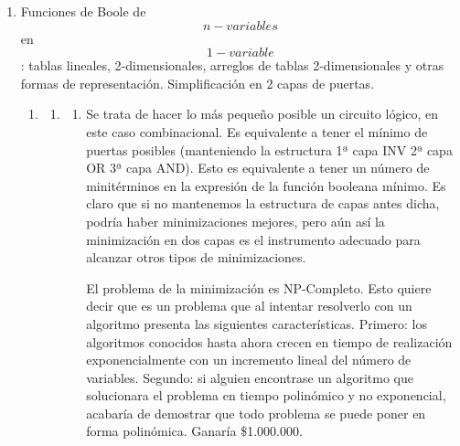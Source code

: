 \begin{enumerate}
\begin{enumerate}
\begin{enumerate}
\begin{enumerate}
        \[\mathtt{\mathrm{H}} = \begin{pmatrix}
        1 & 0 \\
        0 & 1 \\
        1 & 0 \\
        0 & 1
        \end{pmatrix}\]

        \[\begin{pmatrix}
        0 & 1 & 0 & 1 \\
        0 & 0 & 1 & 1
        \end{pmatrix}\rightarrow\begin{pmatrix}
        0 & 1 & 0 & 1 \\
        0 & 0 & 1 & 1 \\
        0 & 1 & 0 & 1 \\
        0 & 0 & 1 & 1
        \end{pmatrix}\]
      \end{enumerate}
    \end{enumerate}
  \end{enumerate}
\item
  Funciones de Boole de \[n - \mathit{variables}\] en
  \[1 - \mathit{variable}\]: tablas lineales, 2-dimensiona\-les,
  arreglos de tablas 2-dimensionales y otras formas de representación.
  Simplificación en 2 capas de puertas.

  \begin{enumerate}
  \def\labelenumii{\arabic{enumii}.}
  \item
    \begin{enumerate}
    \def\labelenumiii{\arabic{enumiii}.}
    \item
      \begin{enumerate}
      \def\labelenumiv{\arabic{enumiv}.}
      \item
        Se trata de hacer lo más pequeño posible un circuito lógico, en
        este caso combinacional. Es equivalente a tener el mínimo de
        puertas posibles (manteniendo la estructura 1ª capa INV 2ª capa
        OR 3ª capa AND). Esto es equivalente a tener un número de
        minitérminos en la expresión de la función booleana mínimo. Es
        claro que si no mantenemos la estructura de capas antes dicha,
        podría haber minimizaciones mejores, pero aún así la
        minimización en dos capas es el instrumento adecuado para
        alcanzar otros tipos de minimizaciones.

        El problema de la minimización es NP-Completo. Esto quiere decir
        que es un problema que al intentar resolverlo con un algoritmo
        presenta las siguientes características. Primero: los algoritmos
        conocidos hasta ahora crecen en tiempo de realización
        exponencialmente con un incremento lineal del número de
        variables. Segundo: si alguien encontrase un algoritmo que
        solucionara el problema en tiempo polinómico y no exponencial,
        acabaría de demostrar que todo problema se puede poner en forma
        polinómica. Ganaría \$1.000.000.


\end{enumerate}
\end{enumerate}
\end{enumerate}
\end{enumerate}
